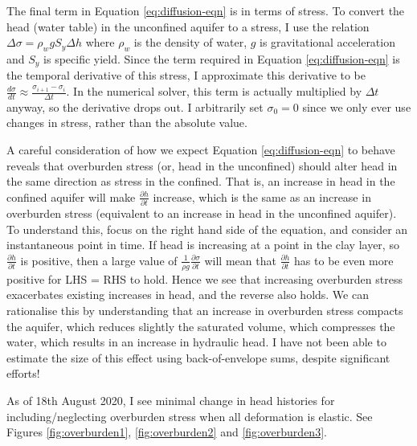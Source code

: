 \documentclass{article}
\begin{document}
The final term in Equation \ref{eq:diffusion-eqn} is in terms of stress. To convert the head (water table) in the unconfined aquifer to a stress, I use the relation $\Delta \sigma = \rho_w g S_y \Delta h$ where $\rho_w$ is the density of water, $g$ is gravitational acceleration and $S_y$ is specific yield. Since the term required in Equation \ref{eq:diffusion-eqn} is the temporal derivative of this stress, I approximate this derivative to be $\frac{d\sigma}{dt} \approx \frac{\sigma_{i+1} - \sigma_{i}}{\Delta t}$. In the numerical solver, this term is actually multiplied by $\Delta t$ anyway, so the derivative drops out. I arbitrarily set $\sigma_0 = 0$ since we only ever use changes in stress, rather than the absolute value. 

A careful consideration of how we expect Equation \ref{eq:diffusion-eqn} to behave reveals that overburden stress (or, head in the unconfined) should alter head in the same direction as stress in the confined. That is, an increase in head in the confined aquifer will make $\frac{\partial{h}}{\partial{t}}$ increase, which is the same as an increase in overburden stress (equivalent to an increase in head in the unconfined aquifer). To understand this, focus on the right hand side of the equation, and consider an instantaneous point in time. If head is increasing at a point in the clay layer, so $\frac{\partial{h}}{\partial{t}}$ is positive, then a large value of $ \frac{1}{\rho g} \frac{\partial \sigma}{\partial t}$ will mean that $\frac{\partial{h}}{\partial{t}}$ has to be even more positive for LHS = RHS to hold. Hence we see that increasing overburden stress exacerbates existing increases in head, and the reverse also holds. We can rationalise this by understanding that an increase in overburden stress compacts the aquifer, which reduces slightly the saturated volume, which compresses the water, which results in an increase in hydraulic head. I have not been able to estimate the size of this effect using back-of-envelope sums, despite significant efforts!

As of 18th August 2020, I see minimal change in head histories for including/neglecting overburden stress when all deformation is elastic. See Figures \ref{fig:overburden1}, 
\ref{fig:overburden2} and \ref{fig:overburden3}.
\end{document}
